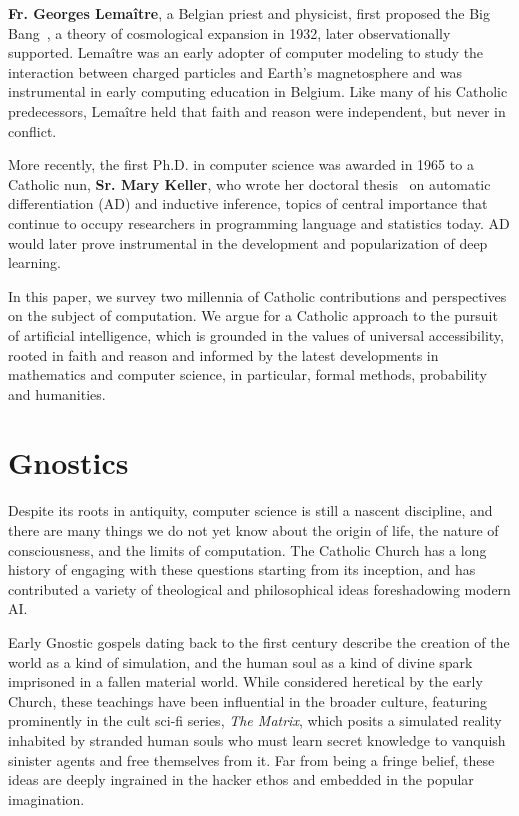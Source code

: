 \documentclass[sigplan,nonacm]{acmart}\settopmatter{printfolios=false,printccs=false,printacmref=false}
\begin{document}
  \textbf{Fr. Georges Lema\^itre}, a Belgian priest and physicist, first proposed the Big Bang~\cite{lemaitre1931beginning}, a theory of cosmological expansion in 1932, later observationally supported. Lema\^itre was an early adopter of computer modeling to study the interaction between charged particles and Earth's magnetosphere and was instrumental in early computing education in Belgium. Like many of his Catholic predecessors, Lema\^itre held that faith and reason were independent, but never in conflict.

  More recently, the first Ph.D. in computer science was awarded in 1965 to a Catholic nun, \textbf{Sr. Mary Keller}, who wrote her doctoral thesis~\cite{keller1965inductive} on automatic differentiation (AD) and inductive inference, topics of central importance that continue to occupy researchers in programming language and statistics today. AD would later prove instrumental in the development and popularization of deep learning.

  In this paper, we survey two millennia of Catholic contributions and perspectives on the subject of computation. We argue for a Catholic approach to the pursuit of artificial intelligence, which is grounded in the values of universal accessibility, rooted in faith and reason and informed by the latest developments in mathematics and computer science, in particular, formal methods, probability and humanities.

 \section{Gnostics}

  Despite its roots in antiquity, computer science is still a nascent discipline, and there are many things we do not yet know about the origin of life, the nature of consciousness, and the limits of computation. The Catholic Church has a long history of engaging with these questions starting from its inception, and has contributed a variety of theological and philosophical ideas foreshadowing modern AI.

  Early Gnostic gospels dating back to the first century describe the creation of the world as a kind of simulation, and the human soul as a kind of divine spark imprisoned in a fallen material world. While considered heretical by the early Church, these teachings have been influential in the broader culture, featuring prominently in the cult sci-fi series, \textit{The Matrix}, which posits a simulated reality inhabited by stranded human souls who must learn secret knowledge to vanquish sinister agents and free themselves from it. Far from being a fringe belief, these ideas are deeply ingrained in the hacker ethos and embedded in the popular imagination.
\end{document}
